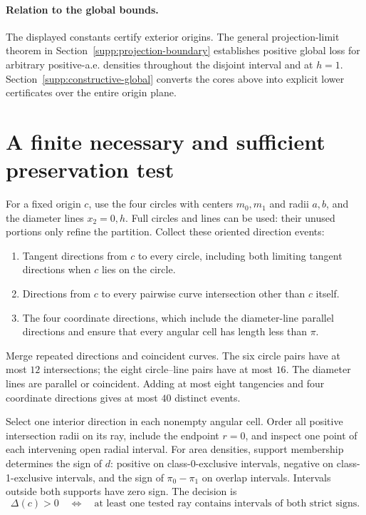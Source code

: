 \paragraph{Relation to the global bounds.}
The displayed constants certify exterior origins. The general projection-limit theorem in Section~\ref{supp:projection-boundary} establishes positive global loss for arbitrary positive-a.e. densities throughout the disjoint interval and at $h=1$. Section~\ref{supp:constructive-global} converts the cores above into explicit lower certificates over the entire origin plane.

\section{A finite necessary and sufficient preservation test}
\label{supp:finite}

For a fixed origin $c$, use the four circles with centers $m_0,m_1$ and radii $a,b$, and the diameter lines $x_2=0,h$. Full circles and lines can be used: their unused portions only refine the partition. Collect these oriented direction events:
\begin{enumerate}
\item Tangent directions from $c$ to every circle, including both limiting tangent directions when $c$ lies on the circle.
\item Directions from $c$ to every pairwise curve intersection other than $c$ itself.
\item The four coordinate directions, which include the diameter-line parallel directions and ensure that every angular cell has length less than $\pi$.
\end{enumerate}
Merge repeated directions and coincident curves. The six circle pairs have at most $12$ intersections; the eight circle--line pairs have at most $16$. The diameter lines are parallel or coincident. Adding at most eight tangencies and four coordinate directions gives at most $40$ distinct events.

Select one interior direction in each nonempty angular cell. Order all positive intersection radii on its ray, include the endpoint $r=0$, and inspect one point of each intervening open radial interval. For area densities, support membership determines the sign of $d$: positive on class-0-exclusive intervals, negative on class-1-exclusive intervals, and the sign of $\pi_0-\pi_1$ on overlap intervals. Intervals outside both supports have zero sign. The decision is
\begin{equation}
 \Delta(c)>0
 \quad\Longleftrightarrow\quad
 \text{at least one tested ray contains intervals of both strict signs.}
 \label{supp:eq:finite-test}
\end{equation}

